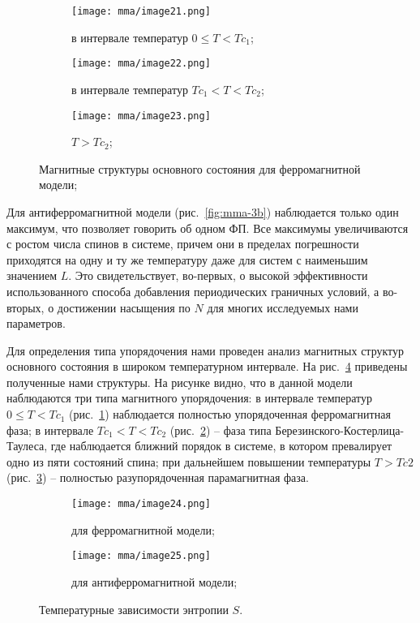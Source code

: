 \begin{figure}[ht]
    \begin{subfigure}{0.33\textwidth}
        \texttt{[image: mma/image21.png]}
        \caption{в интервале температур $0 \leq T < Tc_1$;}
        \label{fig:mma-4a}
    \end{subfigure}
    \begin{subfigure}{0.33\textwidth}
        \texttt{[image: mma/image22.png]}
        \caption{в интервале температур $Tc_1 < T < Tc_2$;}
        \label{fig:mma-4b}
    \end{subfigure}
    \begin{subfigure}{0.33\textwidth}
        \texttt{[image: mma/image23.png]}
        \caption{$T > Tc_2$;}
        \label{fig:mma-4c}
    \end{subfigure}
    \caption{Магнитные структуры основного состояния для ферромагнитной модели;}
    \label{fig:mma-4}
\end{figure}

Для антиферромагнитной модели (рис.~\ref{fig:mma-3b}) наблюдается только один максимум, что позволяет говорить об одном ФП. Все максимумы увеличиваются с ростом числа спинов в системе, причем они в пределах погрешности приходятся на одну и ту же температуру даже для систем с наименьшим значением $L$. Это свидетельствует, во-первых, о высокой эффективности использованного способа добавления периодических граничных условий, а во-вторых, о достижении насыщения по $N$ для многих исследуемых нами параметров.

Для определения типа упорядочения нами проведен анализ магнитных структур основного состояния в широком температурном интервале. На рис.~\ref{fig:mma-4} приведены полученные нами структуры. На рисунке видно, что в данной модели наблюдаются три типа магнитного упорядочения: в интервале температур $0 \leq T < Tc_1$ (рис.~\ref{fig:mma-4a}) наблюдается полностью упорядоченная ферромагнитная фаза; в интервале $Tc_1 < T < Tc_2$ (рис.~\ref{fig:mma-4b}) -- фаза типа Березинского-Костерлица-Таулеса, где наблюдается ближний порядок в системе, в котором превалирует одно из пяти состояний спина; при дальнейшем повышении температуры $T > Tc2$ (рис.~\ref{fig:mma-4c}) -- полностью разупорядоченная парамагнитная фаза.

\begin{figure}[ht]
    \centering
    \begin{subfigure}{0.45\textwidth}
        \texttt{[image: mma/image24.png]}
        \caption{для ферромагнитной модели;}
    \end{subfigure}
    \begin{subfigure}{0.45\textwidth}
        \texttt{[image: mma/image25.png]}
        \caption{для антиферромагнитной модели;}
    \end{subfigure}
    \caption{Температурные зависимости энтропии $S$.}
    \label{fig:mma-5}
\end{figure}

